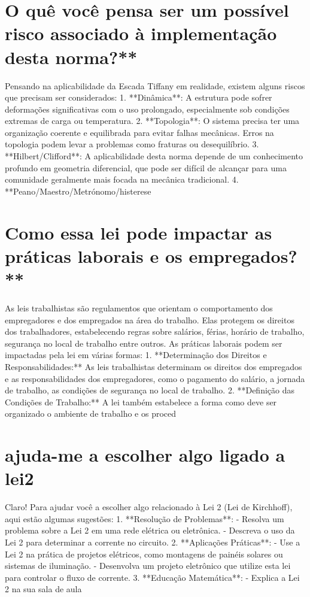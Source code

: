 \documentclass[11pt,a4paper]{article}
\begin{document}
\section{O quê você pensa ser um possível risco associado à implementação desta norma?**}
Pensando na aplicabilidade da Escada Tiffany em realidade, existem alguns riscos que precisam ser considerados: 1. **Dinâmica**: A estrutura pode sofrer deformações significativas com o uso prolongado, especialmente sob condições extremas de carga ou temperatura. 2. **Topologia**: O sistema precisa ter uma organização coerente e equilibrada para evitar falhas mecânicas. Erros na topologia podem levar a problemas como fraturas ou desequilíbrio. 3. **Hilbert/Clifford**: A aplicabilidade desta norma depende de um conhecimento profundo em geometria diferencial, que pode ser difícil de alcançar para uma comunidade geralmente mais focada na mecânica tradicional. 4. **Peano/Maestro/Metrónomo/histerese

\section{Como essa lei pode impactar as práticas laborais e os empregados?**}
As leis trabalhistas são regulamentos que orientam o comportamento dos empregadores e dos empregados na área do trabalho. Elas protegem os direitos dos trabalhadores, estabelecendo regras sobre salários, férias, horário de trabalho, segurança no local de trabalho entre outros. As práticas laborais podem ser impactadas pela lei em várias formas: 1. **Determinação dos Direitos e Responsabilidades:** As leis trabalhistas determinam os direitos dos empregados e as responsabilidades dos empregadores, como o pagamento do salário, a jornada de trabalho, as condições de segurança no local de trabalho. 2. **Definição das Condições de Trabalho:** A lei também estabelece a forma como deve ser organizado o ambiente de trabalho e os proced

\section{ajuda-me a escolher algo ligado a lei2}
Claro! Para ajudar você a escolher algo relacionado à Lei 2 (Lei de Kirchhoff), aqui estão algumas sugestões: 1. **Resolução de Problemas**: - Resolva um problema sobre a Lei 2 em uma rede elétrica ou eletrônica. - Descreva o uso da Lei 2 para determinar a corrente no circuito. 2. **Aplicações Práticas**: - Use a Lei 2 na prática de projetos elétricos, como montagens de painéis solares ou sistemas de iluminação. - Desenvolva um projeto eletrônico que utilize esta lei para controlar o fluxo de corrente. 3. **Educação Matemática**: - Explica a Lei 2 na sua sala de aula
\end{document}
